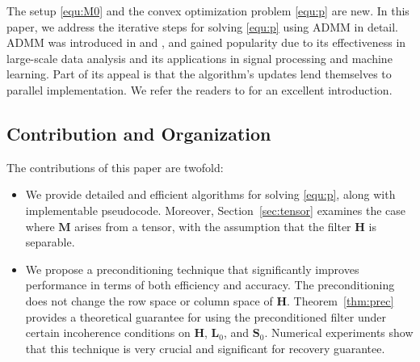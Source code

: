 \documentclass[10pt]{article}  	%
\theoremstyle{definition}
\theoremstyle{definition}
\newcommand{\mH}{\mathbf{H}}
\newcommand{\mL}{\mathbf{L}}
\newcommand{\mM}{\mathbf{M}}
\newcommand{\mS}{\mathbf{S}}
\theoremstyle{remark}
\begin{document}
The setup \eqref{equ:M0} and the convex optimization problem \eqref{equ:p} are new. In this paper, we address the iterative steps for solving \eqref{equ:p} using ADMM in detail. ADMM was introduced in \cite{glowinski1975approximation} and \cite{gabay1976dual}, and gained popularity due to its effectiveness in large-scale data analysis and its applications in signal processing and machine learning. Part of its appeal is that the algorithm’s updates lend themselves to parallel implementation. We refer the readers to \cite{BS11} for an excellent introduction.

\subsection*{Contribution and Organization}
The contributions of this paper are twofold: 
\begin{itemize}
\item We provide detailed and efficient algorithms for solving \eqref{equ:p}, along with implementable pseudocode. %
Moreover, Section~\ref{sec:tensor} examines the case where $\mM$ arises from a tensor, with the assumption that the filter $\mH$ is separable.
\item We propose a preconditioning technique that significantly improves performance in terms of both efficiency and accuracy. The preconditioning does not change the row space or column space of $\mH$. Theorem~\ref{thm:prec} provides a theoretical guarantee for using the preconditioned filter under certain incoherence conditions on $\mH$, $\mL_0$, and $\mS_0$. Numerical experiments show that this technique is very crucial and significant for recovery guarantee. 
\end{itemize}




\end{document}

